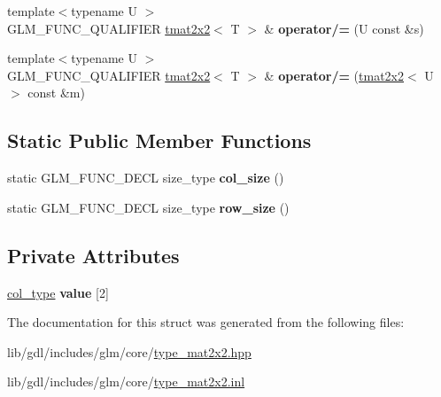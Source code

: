 \begin{DoxyCompactItemize}
\item 
\hypertarget{structglm_1_1detail_1_1tmat2x2_ae1b00b891d297f31bff39ad6cc8ac8a9}{}{\footnotesize template$<$typename U $>$ }\\G\+L\+M\+\_\+\+F\+U\+N\+C\+\_\+\+Q\+U\+A\+L\+I\+F\+I\+E\+R \hyperlink{structglm_1_1detail_1_1tmat2x2}{tmat2x2}$<$ T $>$ \& {\bfseries operator/=} (U const \&s)\label{structglm_1_1detail_1_1tmat2x2_ae1b00b891d297f31bff39ad6cc8ac8a9}

\item 
\hypertarget{structglm_1_1detail_1_1tmat2x2_aec88ffc74ce1e36a0e8cc82aee6c002a}{}{\footnotesize template$<$typename U $>$ }\\G\+L\+M\+\_\+\+F\+U\+N\+C\+\_\+\+Q\+U\+A\+L\+I\+F\+I\+E\+R \hyperlink{structglm_1_1detail_1_1tmat2x2}{tmat2x2}$<$ T $>$ \& {\bfseries operator/=} (\hyperlink{structglm_1_1detail_1_1tmat2x2}{tmat2x2}$<$ U $>$ const \&m)\label{structglm_1_1detail_1_1tmat2x2_aec88ffc74ce1e36a0e8cc82aee6c002a}

\end{DoxyCompactItemize}
\subsection*{Static Public Member Functions}
\begin{DoxyCompactItemize}
\item 
\hypertarget{structglm_1_1detail_1_1tmat2x2_a5c1a631a45f3ea10859433efd7d2c33a}{}static G\+L\+M\+\_\+\+F\+U\+N\+C\+\_\+\+D\+E\+C\+L size\+\_\+type {\bfseries col\+\_\+size} ()\label{structglm_1_1detail_1_1tmat2x2_a5c1a631a45f3ea10859433efd7d2c33a}

\item 
\hypertarget{structglm_1_1detail_1_1tmat2x2_a7b779a0e12e4e42a4372b03562ce7df9}{}static G\+L\+M\+\_\+\+F\+U\+N\+C\+\_\+\+D\+E\+C\+L size\+\_\+type {\bfseries row\+\_\+size} ()\label{structglm_1_1detail_1_1tmat2x2_a7b779a0e12e4e42a4372b03562ce7df9}

\end{DoxyCompactItemize}
\subsection*{Private Attributes}
\begin{DoxyCompactItemize}
\item 
\hypertarget{structglm_1_1detail_1_1tmat2x2_a9651a8c0698a6981861db3f57c53647c}{}\hyperlink{structglm_1_1detail_1_1tvec2}{col\+\_\+type} {\bfseries value} \mbox{[}2\mbox{]}\label{structglm_1_1detail_1_1tmat2x2_a9651a8c0698a6981861db3f57c53647c}

\end{DoxyCompactItemize}


The documentation for this struct was generated from the following files\+:\begin{DoxyCompactItemize}
\item 
lib/gdl/includes/glm/core/\hyperlink{type__mat2x2_8hpp}{type\+\_\+mat2x2.\+hpp}\item 
lib/gdl/includes/glm/core/\hyperlink{type__mat2x2_8inl}{type\+\_\+mat2x2.\+inl}\end{DoxyCompactItemize}
